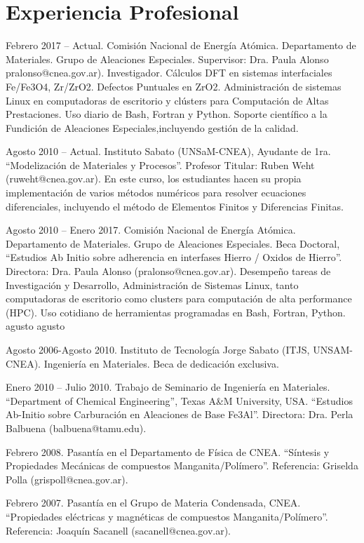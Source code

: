 \section{Experiencia Profesional}\label{experiencia-profesional}

Febrero 2017 -- Actual. Comisión Nacional de Energía Atómica.
Departamento de Materiales. Grupo de Aleaciones Especiales. Supervisor:
Dra. Paula Alonso pralonso@cnea.gov.ar). Investigador. Cálculos DFT en
sistemas interfaciales Fe/Fe3O4, Zr/ZrO2. Defectos Puntuales en ZrO2.
Administración de sistemas Linux en computadoras de escritorio y
clústers para Computación de Altas Prestaciones. Uso diario de Bash,
Fortran y Python. Soporte científico a la Fundición de Aleaciones
Especiales,incluyendo gestión de la calidad.

Agosto 2010 -- Actual. Instituto Sabato (UNSaM-CNEA), Ayudante de 1ra.
``Modelización de Materiales y Procesos''. Profesor Titular: Ruben Weht
(ruweht@cnea.gov.ar). En este curso, los estudiantes hacen su propia
implementación de varios métodos numéricos para resolver ecuaciones
diferenciales, incluyendo el método de Elementos Finitos y Diferencias
Finitas.

Agosto 2010 -- Enero 2017. Comisión Nacional de Energía Atómica.
Departamento de Materiales. Grupo de Aleaciones Especiales. Beca
Doctoral, ``Estudios Ab Initio sobre adherencia en interfases Hierro /
Oxidos de Hierro''. Directora: Dra. Paula Alonso (pralonso@cnea.gov.ar).
Desempeño tareas de Investigación y Desarrollo, Administración de
Sistemas Linux, tanto computadoras de escritorio como clusters para
computación de alta performance (HPC). Uso cotidiano de herramientas
programadas en Bash, Fortran, Python.
agusto 
agusto 

Agosto 2006-Agosto 2010. Instituto de Tecnología Jorge Sabato (ITJS,
UNSAM-CNEA). Ingeniería en Materiales. Beca de dedicación exclusiva.

Enero 2010 -- Julio 2010. Trabajo de Seminario de Ingeniería en
Materiales. ``Department of Chemical Engineering'', Texas A\&M
University, USA. ``Estudios Ab-Initio sobre Carburación en Aleaciones de
Base Fe3Al''. Directora: Dra. Perla Balbuena (balbuena@tamu.edu).

Febrero 2008. Pasantía en el Departamento de Física de CNEA. ``Síntesis
y Propiedades Mecánicas de compuestos Manganita/Polímero''. Referencia:
Griselda Polla (grispoll@cnea.gov.ar).

Febrero 2007. Pasantía en el Grupo de Materia Condensada, CNEA.
``Propiedades eléctricas y magnéticas de compuestos
Manganita/Polímero''. Referencia: Joaquín Sacanell
(sacanell@cnea.gov.ar).

